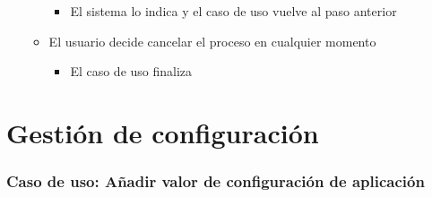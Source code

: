 \documentclass[12pt,a4paperpaper,]{report}
\providecommand{\tightlist}{%
  \setlength{\itemsep}{0pt}\setlength{\parskip}{0pt}}
\begin{document}
\begin{itemize}
\begin{itemize}
    \begin{itemize}
    \tightlist
    \item
      El sistema lo indica y el caso de uso vuelve al paso anterior
    \end{itemize}
  \item
    El usuario decide cancelar el proceso en cualquier momento

    \begin{itemize}
    \tightlist
    \item
      El caso de uso finaliza
    \end{itemize}
  \end{itemize}
\end{itemize}

\section{Gestión de configuración}\label{gestiuxf3n-de-configuraciuxf3n}

\subsubsection{Caso de uso: Añadir valor de configuración de
aplicación}\label{caso-de-uso-auxf1adir-valor-de-configuraciuxf3n-de-aplicaciuxf3n}
\end{document}
